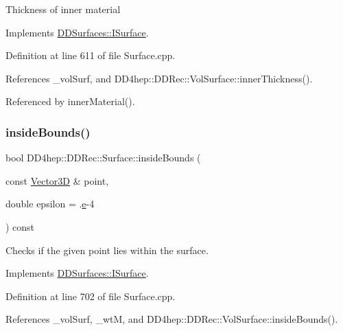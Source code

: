 Thickness of inner material 

Implements \hyperlink{class_d_d_surfaces_1_1_i_surface_ab6913582dd6c1f44df2038705ce2aea6}{D\+D\+Surfaces\+::\+I\+Surface}.



Definition at line 611 of file Surface.\+cpp.



References \+\_\+vol\+Surf, and D\+D4hep\+::\+D\+D\+Rec\+::\+Vol\+Surface\+::inner\+Thickness().



Referenced by inner\+Material().

\hypertarget{class_d_d4hep_1_1_d_d_rec_1_1_surface_a80a84ee1e6030a6df90f9cf6da06f041}{}\label{class_d_d4hep_1_1_d_d_rec_1_1_surface_a80a84ee1e6030a6df90f9cf6da06f041} 
\subsubsection{\texorpdfstring{inside\+Bounds()}{insideBounds()}}
{\footnotesize\ttfamily bool D\+D4hep\+::\+D\+D\+Rec\+::\+Surface\+::inside\+Bounds (\begin{DoxyParamCaption}\item[{const \hyperlink{class_d_d_surfaces_1_1_vector3_d}{Vector3D} \&}]{point,  }\item[{double}]{epsilon = {.\hyperlink{_volumes_8cpp_a8a9a1f93e9b09afccaec215310e64142}{e}-\/4} }\end{DoxyParamCaption}) const\hspace{0.3cm}{\ttfamily [virtual]}}



Checks if the given point lies within the surface. 



Implements \hyperlink{class_d_d_surfaces_1_1_i_surface_a16aa78cb8c01cd5993b7cf23f55a7e3a}{D\+D\+Surfaces\+::\+I\+Surface}.



Definition at line 702 of file Surface.\+cpp.



References \+\_\+vol\+Surf, \+\_\+wtM, and D\+D4hep\+::\+D\+D\+Rec\+::\+Vol\+Surface\+::inside\+Bounds().

\hypertarget{class_d_d4hep_1_1_d_d_rec_1_1_surface_afd98a91243f48c24fa45b3e812785401}{}\label{class_d_d4hep_1_1_d_d_rec_1_1_surface_afd98a91243f48c24fa45b3e812785401} 
